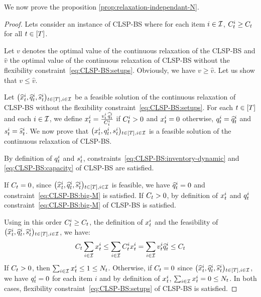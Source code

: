 
We now prove the proposition \ref{prop:relaxation-independant-N}.

\begin{proof}
Lets consider an instance of CLSP-BS where for each item $i\in\mathcal{I}$, $C_t^i\ge C_t$ for all $t\in\range{\horizon}$.

Let $v$ denotes the optimal value of the continuous relaxation of the CLSP-BS and $\widehat{v}$ the optimal value of the continuous relaxation of CLSP-BS without the flexibility constraint~\eqref{eq:CLSP-BS:setups}. Obviously, we have $v \ge \widehat{v}$. Let us show that $v \le \widehat{v}$.

Let $\bracket{\widehat{\setup}_t^i, \widehat{\quantity}_t^i, \widehat{\inventory}_t^i}_{t\in\range{\horizon},i\in\REF}$ be a feasible solution of the continuous relaxation of CLSP-BS without the flexibility constraint~\eqref{eq:CLSP-BS:setups}.
For each $t\in\range{\horizon}$ and each $i\in\mathcal{I}$, we define
$x_t^i=\frac{v_t^i\,\widehat{q}_t^i}{C_t^i}$ if $C_t^i>0$ and $x_t^i=0$ otherwise, $q_t^i=\widehat{q}_t^i$ and $s_t^i=\widehat{s}_t^i$. We now prove that $\bracket{\setup_t^i, \quantity_t^i, \inventory_t^i}_{t\in\range{\horizon},i\in\REF}$ is a feasible solution of the continuous relaxation of CLSP-BS.

By definition of $q_t^i$ and $s_t^i$, constraints~\eqref{eq:CLSP-BS:inventory-dynamic} and \eqref{eq:CLSP-BS:capacity} of CLSP-BS are satisfied.

If $C_t=0$, since $\bracket{\widehat{\setup}_t^i, \widehat{\quantity}_t^i, \widehat{\inventory}_t^i}_{t\in\range{\horizon},i\in\REF}$ is feasible, we have $\widehat{q}_t^i=0$ and constraint~\eqref{eq:CLSP-BS:big-M} is satisfied. If $C_t>0$, by definition of $x_t^i$ and $q_t^i$ constraint~\eqref{eq:CLSP-BS:big-M} of CLSP-BS is satisfied.

Using in this order $C_t^i\ge C_t$, the definition of $x_t^i$ and the feasibility of $\bracket{\widehat{\setup}_t^i, \widehat{\quantity}_t^i, \widehat{\inventory}_t^i}_{t\in\range{\horizon},i\in\REF}$, we have:
$$
C_t\sum_{i\in\mathcal{I}}x_t^i
\le
\sum_{i\in\mathcal{I}}C_t^ix_t^i
=
\sum_{i\in\mathcal{I}}v_t^i\widehat{q}_t^i
\le
C_t
$$
If $C_t>0$, then $\sum_{i\in\mathcal{I}}x_t^i\le 1\le N_t$. Otherwise, if $C_t=0$ since $\bracket{\widehat{\setup}_t^i, \widehat{\quantity}_t^i, \widehat{\inventory}_t^i}_{t\in\range{\horizon},i\in\REF}$, we have $q_t^i=0$ for each item $i$ and by definition of $x_t^i$, $\sum_{i\in\mathcal{I}}x_t^i=0\le N_t$. In both cases, flexibility constraint~\eqref{eq:CLSP-BS:setups} of CLSP-BS is satisfied.


\end{proof}
